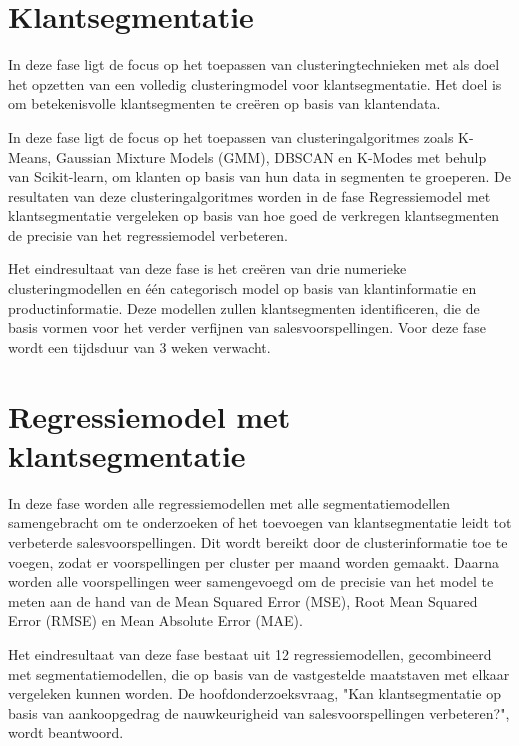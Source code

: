\newpage

\section{Klantsegmentatie}


In deze fase ligt de focus op het toepassen van clusteringtechnieken met als doel het opzetten van een volledig clusteringmodel voor klantsegmentatie. Het doel is om betekenisvolle klantsegmenten te creëren op basis van klantendata.


\vspace{1 em}

In deze fase ligt de focus op het toepassen van clusteringalgoritmes zoals K-Means, Gaussian Mixture Models (GMM), DBSCAN en K-Modes met behulp van Scikit-learn, om klanten op basis van hun data in segmenten te groeperen. De resultaten van deze clusteringalgoritmes worden in de fase Regressiemodel met klantsegmentatie vergeleken op basis van hoe goed de verkregen klantsegmenten de precisie van het regressiemodel verbeteren.

\vspace{1 em}

Het eindresultaat van deze fase is het creëren van drie numerieke clusteringmodellen en één categorisch model op basis van klantinformatie en productinformatie. Deze modellen zullen klantsegmenten identificeren, die de basis vormen voor het verder verfijnen van salesvoorspellingen. Voor deze fase wordt een tijdsduur van 3 weken verwacht.


\newpage

\section{Regressiemodel met klantsegmentatie}


In deze fase worden alle regressiemodellen met alle segmentatiemodellen samengebracht om te onderzoeken of het toevoegen van klantsegmentatie leidt tot verbeterde salesvoorspellingen. Dit wordt bereikt door de clusterinformatie toe te voegen, zodat er voorspellingen per cluster per maand worden gemaakt. Daarna worden alle voorspellingen weer samengevoegd om de precisie van het model te meten aan de hand van de Mean Squared Error (MSE), Root Mean Squared Error (RMSE) en Mean Absolute Error (MAE).


\vspace{1 em}

Het eindresultaat van deze fase bestaat uit 12 regressiemodellen, gecombineerd met segmentatiemodellen, die op basis van de vastgestelde maatstaven met elkaar vergeleken kunnen worden. De hoofdonderzoeksvraag, "Kan klantsegmentatie op basis van aankoopgedrag de nauwkeurigheid van salesvoorspellingen verbeteren?", wordt beantwoord. 

